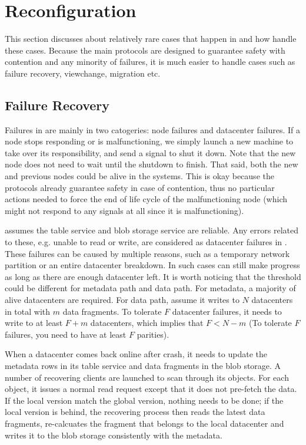 \section{Reconfiguration}
This section discusses about relatively rare cases that happen in {\name}
and how {\name} handle these cases. Because the main protocols are designed
to guarantee safety with contention and any minority of failures, it is much
easier to handle cases such as failure recovery, viewchange, migration etc.
\subsection{Failure Recovery}

Failures in {\name} are mainly in two catogeries: {\name} node failures and
datacenter failures. If a {\name} node stops responding or is malfunctioning,
we simply launch a new machine to take over its responsibility, and send a
signal to shut it down. Note that the new node does not need to wait until
the shutdown to finish. That said, both the new and previous nodes could be
alive in the systems. This is okay because the {\name} protocols already
guarantee safety in case of contention, thus no particular actions needed
to force the end of life cycle of the malfunctioning node (which might not
respond to any signals at all since it is malfunctioning).

{\name} assumes the table service and blob storage service are reliable.
Any errors related to these, e.g. unable to read or write, are considered
as datacenter failures in {\name}. These failures can be caused by multiple
reasons, such as a temporary network partition or an entire datacenter breakdown.
In such cases {\name} can still make progress as long as there are enough
datacenter left. It is worth noticing that the threshold could be different for
metadata path and data path. For metadata, a majority of alive datacenters
are required. For data path, assume it writes to $N$ datacenters in total with
$m$ data fragments. To tolerate $F$ datacenter failures, it needs to write
to at least $F+m$ datacenters, which implies that $F<N-m$ (To tolerate $F$
failures, you need to have at least $F$ parities).

When a datacenter comes back online after crash, it needs to update the
metadata rows in its table service and data fragments in the blob storage.
A number of recovering clients are launched to scan through its objects.
For each object, it issues a normal read request except that it does not
pre-fetch the data. If the local version match the global version, nothing
needs to be done; if the local version is behind, the recovering process
then reads the latest data fragments, re-calcuates the fragment that belongs
to the local datacenter and writes it to the blob storage consistently with
the metadata.

